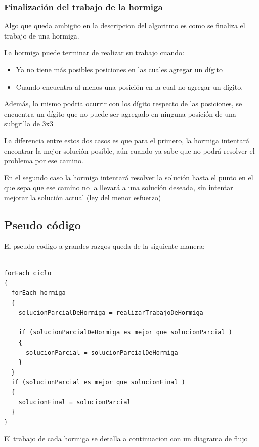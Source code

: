 \documentclass[a4paper,spanish]{article}
\begin{document}
\subsubsection{Finalización del trabajo de la hormiga}

Algo que queda ambigüo en la descripcion del algoritmo es como se finaliza el trabajo de una hormiga.

La hormiga puede terminar de realizar su trabajo cuando:

\begin{itemize}
	\item Ya no tiene más posibles posiciones en las cuales agregar un dígito
	\item Cuando encuentra al menos una posición en la cual no agregar un dígito.
\end{itemize}
 
Además, lo mismo podria ocurrir con los dígito respecto de las posiciones, se encuentra un dígito que no puede ser agregado
en ninguna posición de una subgrilla de 3x3

La diferencia entre estos dos casos es que para el primero, la hormiga intentará encontrar la mejor solución posible, aún
cuando ya sabe que no podrá resolver el problema por ese camino.

En el segundo caso la hormiga intentará resolver la solución hasta el punto en el que sepa que ese camino no la llevará a
una solución deseada, sin intentar mejorar la solución actual (ley del menor esfuerzo)


\subsection{Pseudo código}

El pseudo codigo a grandes razgos queda de la siguiente manera:

\begin{verbatim}

forEach ciclo
{
  forEach hormiga
  {
    solucionParcialDeHormiga = realizarTrabajoDeHormiga
    
    if (solucionParcialDeHormiga es mejor que solucionParcial )
    {
      solucionParcial = solucionParcialDeHormiga
    }
  }
  if (solucionParcial es mejor que solucionFinal )
  {
    solucionFinal = solucionParcial
  }
}

\end{verbatim}

El trabajo de cada hormiga se detalla a continuacion con un diagrama de flujo
\end{document}
